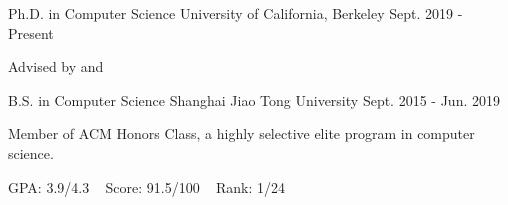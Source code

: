 
\begin{cventries}

  \cventry
	{Ph.D. in Computer Science} %
	{University of California, Berkeley} %
	{Sept. 2019 - Present} %
	{} %
	{
		\begin{cvitems} %
			\item {Advised by  and }
		\end{cvitems}
	}

  \cventry
    {B.S. in Computer Science} %
    {Shanghai Jiao Tong University} %
    {Sept. 2015 - Jun. 2019} %
    {} %
    {
    \begin{cvitems} %
    	\item {Member of ACM Honors Class, a highly selective elite program in computer science.}
    	\item {GPA: 3.9/4.3 ~ Score: 91.5/100 ~ Rank: 1/24}
    \end{cvitems}
    }

\end{cventries}